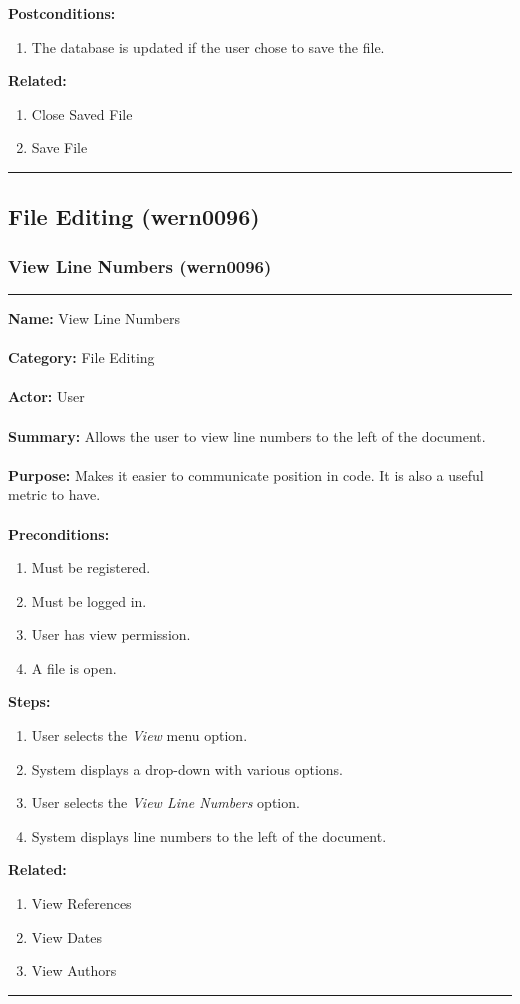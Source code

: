 \documentclass[11pt]{report}
\begin{document}
	\textbf{Postconditions:}
	\begin{enumerate}
		\item The database is updated if the user chose to save the file.
	\end{enumerate}
	\textbf{Related:} 
	\begin{enumerate}
		\item Close Saved File
		\item Save File
	\end{enumerate}
\vspace{8pt}
\hrule
\newpage
	
		
\subsection{File Editing (wern0096)}
\subsubsection{View Line Numbers (wern0096)}
\vspace{2pt}
\hrule
\vspace{8pt}
	\noindent\textbf{Name:} View Line Numbers \\ \\
	\textbf{Category:} File Editing \\ \\
	\textbf{Actor:} User \\ \\
	\textbf{Summary:} Allows the user to view line numbers to the left of the document. \\ \\
	\textbf{Purpose:} Makes it easier to communicate position in code. It is also a useful metric to have.\\ \\
	\textbf{Preconditions:} 
	\begin{enumerate}
		\item Must be registered.
		\item Must be logged in.
		\item User has view permission.
		\item A file is open.
	\end{enumerate}
	\textbf{Steps:}
	\begin{enumerate}
		\item User selects the \textit{View} menu option.
		\item System displays a drop-down with various options.
		\item User selects the \textit{View Line Numbers} option.
		\item System displays line numbers to the left of the document.
	\end{enumerate}
	\textbf{Related:}
	\begin{enumerate}
		\item View References
		\item View Dates
		\item View Authors
	\end{enumerate}
\vspace{8pt}
\hrule
\newpage
\end{document}
